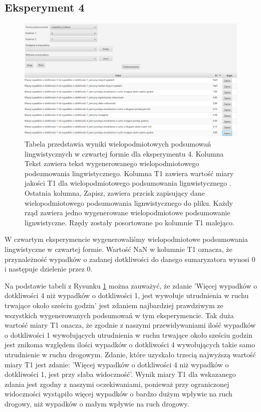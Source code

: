 \documentclass{classrep}
\begin{document}
\newpage
\subsection{Eksperyment 4}
\label{section:ex_wiel4}

\begin{figure}[h!]
 \centering
 \includegraphics[width=15cm]{ex_wiel4.png}
 \vspace{-0.3cm}
 \caption{Tabela przedstawia wyniki wielopodmiotowych podsumowań lingwistycznych w czwartej formie dla eksperymentu 4. Kolumna Tekst zawiera tekst wygenerowanego wielopodmiotowego podsumowania lingwistycznego. Kolumna T1 zawiera wartość miary jakości T1 dla wielopodmiotowego podsumowania lignwistycznego \cite{niewiadomski19}. Ostatnia kolumna, Zapisz, zawiera przcisk zapisujący dane wielopodmiotowego podsumowania lignwistycznego do pliku. Każdy rząd zawiera jedno wygenerowane wielopodmiotowe podsumowanie lignwistyczne. Rzędy zostały posortowane po kolumnie T1 malejąco.  }
 \label{wykr_ex_wiel4}
\end{figure}


W czwartym eksperymencie wygenerowaliśmy wielopodmiotowe podsumowania lingwistyczne w czwartej formie. Wartość NaN w kolumnie T1 oznacza, że przynależność wypadków o zadanej dotkliwości do danego sumaryzatora wynosi 0 i następuje dzielenie przez 0. 

Na podstawie tabeli z Rysunku \ref{wykr_ex_wiel4} można zauważyć, że zdanie 'Więcej wypadków o dotkliwości 4 niż wypadków o dotkliwości 1, jest wywołuje utrudnienia w ruchu trwające około sześciu godzin' jest zdaniem najbardziej prawdziwym ze wszystkich wygenerowanych podsumowań w tym eksperymencie. Tak duża wartość miary T1 onacza, że zgodnie z naszymi przewidywaniami ilość wypadków o dotkliwości 1 wywołujących utrudnienia w ruchu trwające około sześciu godzin jest znikoma względem ilości wypadków o dotkliwości 4 wywołujących takie samo utrudnienie w ruchu drogowym. Zdanie, które uzyskało trzecią najwyższą wartość miary T1 jest zdanie: 'Więcej wypadków o dotkliwości 4 niż wypadków o dotkliwości 1, jest przy słaba widoczność'. Wynik miary T1 dla wskazanego zdania jest zgodny z naszymi oczekiwaniami, ponieważ przy ograniczonej widoczności wystąpiło więcej wypadków o bardzo dużym wpływie na ruch drogowy, niż wypadków o małym wpływie na ruch drogowy. 
\end{document}
